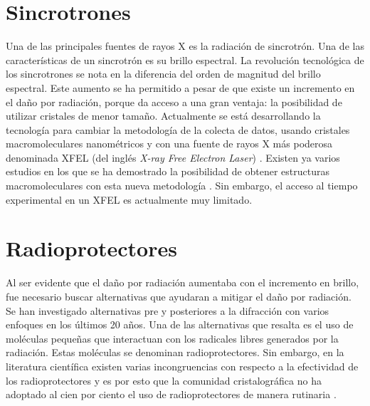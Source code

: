 \section{Sincrotrones}
Una de las principales fuentes de rayos X es la radiación de sincrotrón. Una de las características de un sincrotrón es su brillo espectral. La revolución tecnológica de los sincrotrones se nota en la diferencia del orden de magnitud del brillo espectral. Este aumento se ha permitido a pesar de que existe un incremento en el daño por radiación, porque da acceso a una gran ventaja: la posibilidad de utilizar cristales de menor tamaño.  Actualmente se está desarrollando la tecnología para cambiar la metodología de la colecta de datos, usando cristales macromoleculares nanométricos y con una fuente de rayos X más poderosa denominada XFEL (del inglés \emph{X-ray Free Electron Laser}) \cite{Martin-Garcia2016}. Existen ya varios estudios en los que se ha demostrado la posibilidad de obtener estructuras macromoleculares con esta nueva metodología \cite{Martin-Garcia2016}. Sin embargo, el acceso al tiempo experimental en un XFEL es actualmente muy limitado.

\section{Radioprotectores}
Al ser evidente que el daño por radiación aumentaba con el incremento en brillo, fue necesario buscar alternativas que ayudaran a mitigar el daño por radiación. Se han investigado alternativas pre y posteriores a la difracción con varios enfoques en los últimos 20 años\cite{Garman2017}. Una de las alternativas que resalta es el uso de moléculas pequeñas que interactuan con los radicales libres generados por la radiación. Estas moléculas se denominan radioprotectores.  Sin embargo, en la literatura científica existen varias incongruencias con respecto a la efectividad de los radioprotectores y es por esto que la comunidad cristalográfica no ha adoptado al cien por ciento el uso de radioprotectores de manera rutinaria \cite{Nowak2009, Allan2013}.
